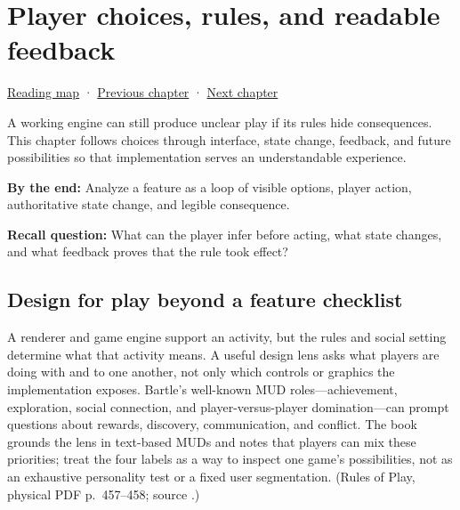 \chapter{Player choices, rules, and readable feedback}\label{05-engine-i-ch009-player-choices-rules-and-readable-feedback}\hypertarget{05-engine-i-ch009}{}\label{stagechapter:05-engine-i-ch009}

\hypertarget{05-engine-i-ch009-player-choices-rules-and-readable-feedback}{}

\hyperref[volume-reading-map]{Reading map} · \hyperref[05-engine-i-ch008-algorithms-application-boundaries-and-a-first-playable]{Previous chapter} · \hyperref[05-engine-i-ch010-engine-changes-across-subsystem-contracts]{Next chapter}

A working engine can still produce unclear play if its rules hide consequences. This chapter follows choices through interface, state change, feedback, and future possibilities so that implementation serves an understandable experience.

\textbf{By the end:} Analyze a feature as a loop of visible options, player action, authoritative state change, and legible consequence.

\textbf{Recall question:} What can the player infer before acting, what state changes, and what feedback proves that the rule took effect?

\section{Design for play beyond a feature checklist}\label{05-engine-i-ch009-design-for-play-beyond-a-feature-checklist}

\hypertarget{05-engine-i-ch009-design-for-play-beyond-a-feature-checklist}{}

A renderer and game engine support an activity, but the rules and social setting determine what that activity means. A useful design lens asks what players are doing with and to one another, not only which controls or graphics the implementation exposes. Bartle's well-known MUD roles---achievement, exploration, social connection, and player-versus-player domination---can prompt questions about rewards, discovery, communication, and conflict. The book grounds the lens in text-based MUDs and notes that players can mix these priorities; treat the four labels as a way to inspect one game's possibilities, not as an exhaustive personality test or a fixed user segmentation. (Rules of Play, physical PDF p.~457--458; source .)


